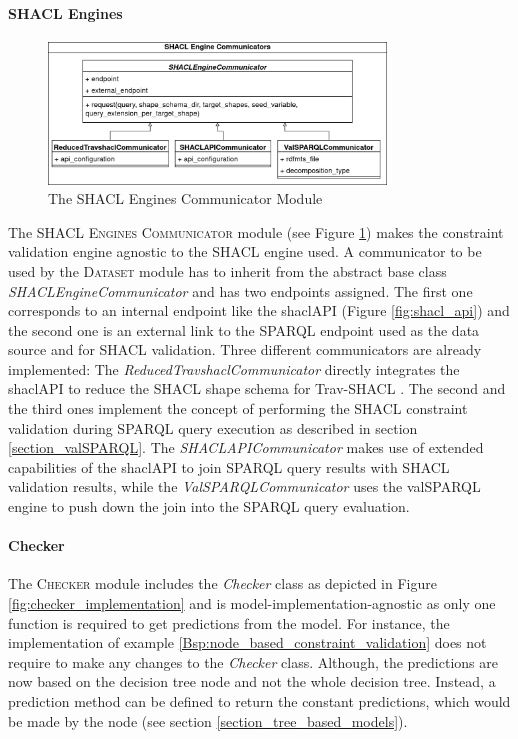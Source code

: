 \paragraph{SHACL Engines} 
\begin{figure}
    \centering
    \includegraphics[width=0.8\textwidth]{images/implementation/shacl_engines_communicator.png}
    \caption{The SHACL Engines Communicator Module}
    \label{fig:shacl_engines_module}
\end{figure}
The \textsc{SHACL Engines Communicator} module (see Figure \ref{fig:shacl_engines_module}) makes the constraint validation engine agnostic to the SHACL engine used. A communicator to be used by the \textsc{Dataset} module has to inherit from the abstract base class \emph{SHACLEngineCommunicator} and has two endpoints assigned. The first one corresponds to an internal endpoint like the shaclAPI (Figure \ref{fig:shacl_api}) and the second one is an external link to the SPARQL endpoint used as the data source and for SHACL validation. Three different communicators are already implemented: The \emph{ReducedTravshaclCommunicator} directly integrates the shaclAPI to reduce the SHACL shape schema for Trav-SHACL \cite{figuera2021trav}. The second and the third ones implement the concept of performing the SHACL constraint validation during SPARQL query execution as described in section \ref{section_valSPARQL}. The \emph{SHACLAPICommunicator} makes use of extended capabilities of the shaclAPI to join SPARQL query results with SHACL validation results, while the \emph{ValSPARQLCommunicator} uses the valSPARQL engine to push down the join into the SPARQL query evaluation.

\paragraph{Checker} The \textsc{Checker} module includes the \emph{Checker} class as depicted in Figure \ref{fig:checker_implementation} and is model-implementation-agnostic as only one function is required to get predictions from the model. For instance, the implementation of example \ref{Bsp:node_based_constraint_validation} does not require to make any changes to the \emph{Checker} class. Although, the predictions are now based on the decision tree node and not the whole decision tree. Instead, a prediction method can be defined to return the constant predictions, which would be made by the node (see section \ref{section_tree_based_models}). 

